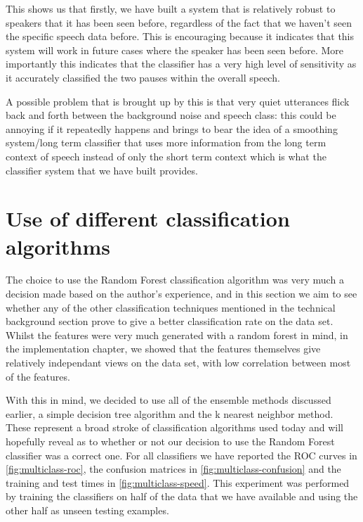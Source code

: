 \documentclass[ %
                    author={Sam Phippen},
                supervisor={Dr. Rafal Bogacz},
                     title={Real time voice activity detectors in noisy personal computing environments},
                  subtitle={},
                    degree={MEng},
                      year={2012} ]{thesis}
\begin{document}
This shows us that firstly, we have built a system that is relatively robust to
speakers that it has been seen before, regardless of the fact that we haven't
seen the specific speech data before. This is encouraging because it indicates
that this system will work in future cases where the speaker has been seen
before.  More importantly this indicates that the classifier has a very high
level of sensitivity as it accurately classified the two pauses within the
overall speech.

A possible problem that is brought up by this is that very quiet utterances
flick back and forth between the background noise and speech class: this could
be annoying if it repeatedly happens and brings to bear the idea of a smoothing
system/long term classifier that uses more information from the long term
context of speech instead of only the short term context which is what the
classifier system that we have built provides.

\section{Use of different classification algorithms}

The choice to use the Random Forest classification algorithm was very much a
decision made based on the author's experience, and in this section we aim to
see whether any of the other classification techniques mentioned in the
technical background section prove to give a better classification rate on the
data set. Whilst the features were very much generated with a random forest in
mind, in the implementation chapter, we showed that the features themselves
give relatively independant views on the data set, with low correlation between
most of the features.

With this in mind, we decided to use all of the ensemble methods discussed
earlier, a simple decision tree algorithm and the k nearest neighbor method.
These represent a broad stroke of classification algorithms used today and will
hopefully reveal as to whether or not our decision to use the Random Forest
classifier was a correct one. For all classifiers we have reported the ROC
curves in \ref{fig:multiclass-roc}, the confusion matrices in
\ref{fig:multiclass-confusion} and the training and test times in
\ref{fig:multiclass-speed}. This experiment was performed by training the
classifiers on half of the data that we have available and using the other half
as unseen testing examples.
\end{document}
